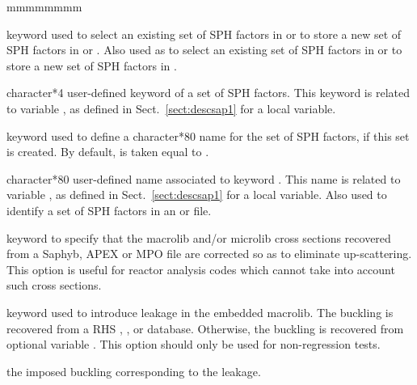 \begin{ListeDeDescription}{mmmmmmmm}
\item[\moc{EQUI}] keyword used to select an existing set of SPH factors in  or to store
a new set of SPH factors in  or . Also used as   to select an
existing set of SPH factors in  or to store a new set of SPH factors in .

\item[\dusa{TEXT4}] character*4 user-defined keyword of a set of SPH factors. This keyword is related to variable
, as defined in Sect.~\ref{sect:descsap1} for a local variable.

\item[\moc{LOCNAM}] keyword used to define a character*80 name for the set of SPH factors, if this set is created. By
default,  is taken equal to .

\item[\dusa{TEXT80}] character*80 user-defined name associated to keyword . This name is related to
variable , as defined in Sect.~\ref{sect:descsap1} for a local variable. Also used to identify a set of
SPH factors in an  or  file.

\item[\moc{UPS}] keyword to specify that the macrolib and/or microlib cross sections recovered from a Saphyb, APEX or MPO file are
corrected so as to eliminate up-scattering. This option is useful for reactor analysis codes which cannot
take into account such cross sections.

\item[\moc{LEAK}] keyword used to introduce leakage in the embedded {\sc macrolib}. The buckling is recovered from
a RHS , ,  or  database. Otherwise, the buckling is recovered from optional variable .
This option should only be used for non-regression tests.

\item[\dusa{b2}] the imposed buckling corresponding to the leakage.

\end{ListeDeDescription}
\eject
